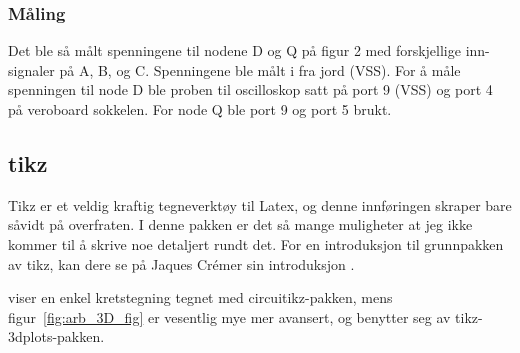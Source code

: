 \subsubsection{Måling}
Det ble så målt spenningene til nodene D og Q på figur 2 med forskjellige inn-signaler på A, B, og C. 
Spenningene ble målt i fra jord (VSS). For å måle spenningen til node D ble proben til oscilloskop satt på port 9 (VSS) og port 4 på veroboard sokkelen. 
For node Q ble port 9 og port 5 brukt.



\subsection{tikz}
Tikz er et veldig kraftig tegneverktøy til Latex, og denne innføringen skraper bare såvidt på overfraten.
I denne pakken er det så mange muligheter at jeg ikke kommer til å skrive noe detaljert rundt det.
For en introduksjon til grunnpakken av tikz, kan dere se på Jaques Crémer sin introduksjon \cite{tikz_intro}.

 viser en enkel kretstegning tegnet med circuitikz-pakken, mens figur~\ref{fig:arb_3D_fig} er vesentlig mye mer avansert, og benytter seg av tikz-3dplots-pakken.



        
        
        
        
        
